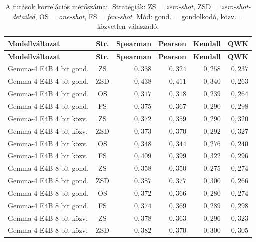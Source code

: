 \documentclass[
]{elteikthesis}[2024/04/26]
\begin{document}
\begin{longtable}{ | l | c | r | r | r | r | }
	\caption[A futások korrelációs mérőszámai]{A futások korrelációs mérőszámai.
	Stratégiák: ZS = \textit{zero-shot}, ZSD = \textit{zero-shot-detailed}, OS = \textit{one-shot}, FS = \textit{few-shot}.
	Mód: gond. = gondolkodó, közv. = közvetlen válaszadó.}
	\label{tab:app:correlations} \\
	\hline
	\textbf{Modellváltozat} & \textbf{Str.} & \textbf{Spearman} & \textbf{Pearson} & \textbf{Kendall} & \textbf{QWK} \\
	\hline \hline
	\endfirsthead
	\hline
	\textbf{Modellváltozat} & \textbf{Str.} & \textbf{Spearman} & \textbf{Pearson} & \textbf{Kendall} & \textbf{QWK} \\
	\hline \hline
	\endhead
	Gemma-4 E4B 4 bit gond. & ZS & $0{,}338$ & $0{,}324$ & $0{,}258$ & $0{,}237$ \\
	\hline
	Gemma-4 E4B 4 bit gond. & ZSD & $0{,}438$ & $0{,}411$ & $0{,}340$ & $0{,}263$ \\
	\hline
	Gemma-4 E4B 4 bit gond. & OS & $0{,}317$ & $0{,}318$ & $0{,}239$ & $0{,}264$ \\
	\hline
	Gemma-4 E4B 4 bit gond. & FS & $0{,}375$ & $0{,}367$ & $0{,}290$ & $0{,}298$ \\
	\hline
	Gemma-4 E4B 4 bit közv. & ZS & $0{,}372$ & $0{,}359$ & $0{,}290$ & $0{,}320$ \\
	\hline
	Gemma-4 E4B 4 bit közv. & ZSD & $0{,}373$ & $0{,}370$ & $0{,}292$ & $0{,}327$ \\
	\hline
	Gemma-4 E4B 4 bit közv. & OS & $0{,}348$ & $0{,}344$ & $0{,}276$ & $0{,}240$ \\
	\hline
	Gemma-4 E4B 4 bit közv. & FS & $0{,}409$ & $0{,}399$ & $0{,}322$ & $0{,}296$ \\
	\hline
	Gemma-4 E4B 8 bit gond. & ZS & $0{,}358$ & $0{,}350$ & $0{,}275$ & $0{,}274$ \\
	\hline
	Gemma-4 E4B 8 bit gond. & ZSD & $0{,}387$ & $0{,}377$ & $0{,}300$ & $0{,}266$ \\
	\hline
	Gemma-4 E4B 8 bit gond. & OS & $0{,}372$ & $0{,}366$ & $0{,}280$ & $0{,}274$ \\
	\hline
	Gemma-4 E4B 8 bit gond. & FS & $0{,}374$ & $0{,}369$ & $0{,}289$ & $0{,}298$ \\
	\hline
	Gemma-4 E4B 8 bit közv. & ZS & $0{,}378$ & $0{,}363$ & $0{,}296$ & $0{,}323$ \\
	\hline
	Gemma-4 E4B 8 bit közv. & ZSD & $0{,}382$ & $0{,}370$ & $0{,}300$ & $0{,}305$ \\

\end{longtable}
\end{document}

